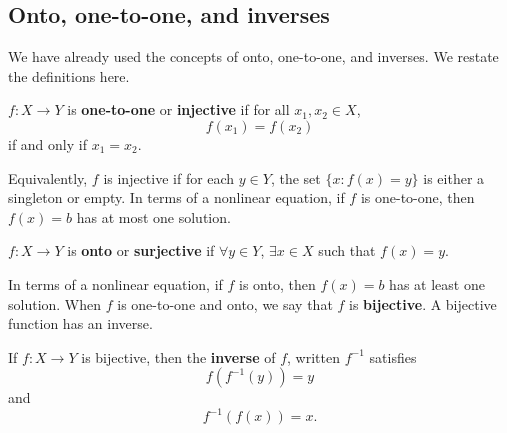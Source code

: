\subsection{Onto, one-to-one, and inverses}
We have already used the concepts of onto, one-to-one, and inverses.
We restate the definitions here.
\begin{definition}
  $f:X \to Y$ is \textbf{one-to-one} or \textbf{injective} if for all
  $x_1, x_2 \in X$, 
  \[ f(x_1) = f(x_2) \]
  if and only if $x_1 = x_2$.
\end{definition}
Equivalently, $f$ is injective if for each $y \in Y$, the set $\{x:
f(x) = y\}$ is either a singleton or empty.  In terms of a nonlinear
equation, if $f$ is one-to-one, then $f(x) = b$ has at most one
solution. 
\begin{definition}
  $f:X \to Y$ is \textbf{onto} or \textbf{surjective} if $\forall y
  \in Y$, $\exists x \in X$ such that $f(x) = y$.
\end{definition}
In terms of a nonlinear equation, if $f$ is onto, then $f(x) = b$ has
at least one solution. When $f$ is one-to-one and onto, we say that
$f$ is \textbf{bijective}. A bijective function has an inverse.
\begin{definition}
  If $f:X \to Y$ is bijective, then the \textbf{inverse} of $f$,
  written $f^{-1}$ satisfies
  \[ f(f^{-1} (y)) = y  \]
  and 
  \[ f^{-1} ( f(x) ) = x. \]
\end{definition}

